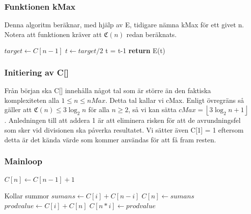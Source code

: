 \documentclass[a4paper,titlepage,swedish]{article}
\newcommand{\C}[1]{\mathfrak C \left( #1 \right)}
\renewcommand{\O}{\mathcal {O}}
\def\lf{\left\lfloor}
\def\rf{\right\rfloor}
\theoremstyle{definition}
\begin{document}
    \subsubsection{Funktionen kMax}
    Denna algoritm beräknar, med hjälp av E, tidigare nämna kMax för ett givet n. Notera att funktionen kräver att $\C{n}$ redan beräknats.

    \begin{algorithm}[H]
        \caption{$\O$}
        \begin{algorithmic}[1]
               \State $target \gets C[n-1] $
               \State $t \gets target/2 $
                \State t = t-1
                \EndWhile
                \State \textbf{return} E(t)
            \EndProcedure
        \end{algorithmic}
    \end{algorithm}


    \subsubsection{Initiering av C[]}
        Från början ska C[] innehålla något tal som är större än den faktiska komplexiteten alla $1 \leq n \leq nMax$. Detta tal kallar vi cMax. Enligt
        {övregräns} så gäller att $\C{n} \leq  3\log_2 n$ \quad för alla $n\ge2$, så vi kan sätta $cMax =  \lf 3\log_2 n +1\rf$. Anledningen till att addera 1 är att eliminera risken för att de avrundningsfel som sker vid divisionen ska påverka resultatet.
        Vi sätter även C[1] = 1 eftersom detta är det kända värde som kommer användas för att få fram resten.
    \subsubsection{Mainloop}

        \begin{algorithm}[H]
        \caption{$\O(nMax^{1.23})$}
        \begin{algorithmic}[1]
                        \State $C[n] \gets C[n-1]+1$
                    \EndIf

                     \Comment Kollar summor
                        \State $sumans \gets C[i]+C[n-i]$
                            \State $ C[n] \gets sumans$
                        \EndIf
                    \EndFor
                        \State $prodvalue \gets C[i]+C[n]$
                            \State $C[n*i] \gets prodvalue$
                        \EndIf
                    \EndFor
                \EndFor
            \EndProcedure
        \end{algorithmic}
    \end{algorithm}
\end{document}
